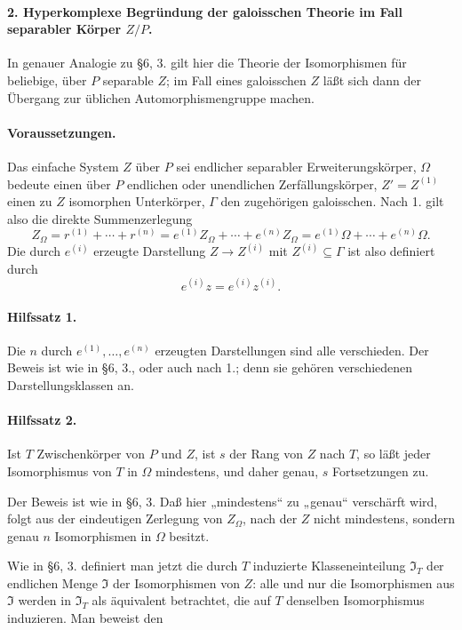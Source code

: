 \documentclass[11pt]{article}
\begin{document}
\paragraph{2. Hyperkomplexe Begründung der galoisschen Theorie im Fall separabler Körper \(Z/P\).}
In genauer Analogie zu §6, 3. gilt hier die Theorie der Isomorphismen für beliebige, über \(P\) separable \(Z\); im Fall eines galoisschen \(Z\) läßt sich dann der Übergang zur üblichen Automorphismengruppe machen.

\paragraph{Voraussetzungen.}
Das einfache System \(Z\) über \(P\) sei endlicher separabler Erweiterungskörper, \(\Omega\) bedeute einen über \(P\) endlichen oder unendlichen Zerfällungskörper, \(Z'=Z^{(1)}\) einen zu \(Z\) isomorphen Unterkörper, \(\Gamma\) den zugehörigen galoisschen. Nach 1. gilt also die direkte Summenzerlegung
\[
        Z_\Omega=r^{(1)}+\cdots+r^{(n)}
        =e^{(1)}Z_\Omega+\cdots+e^{(n)}Z_\Omega
        =e^{(1)}\Omega+\cdots+e^{(n)}\Omega .
\]
Die durch \(e^{(i)}\) erzeugte Darstellung \(Z\to Z^{(i)}\) mit \(Z^{(i)}\subseteq\Gamma\) ist also definiert durch
\[
        e^{(i)}z=e^{(i)}z^{(i)}.
\]

\paragraph{Hilfssatz 1.}
Die \(n\) durch \(e^{(1)},\ldots,e^{(n)}\) erzeugten Darstellungen sind alle verschieden. Der Beweis ist wie in §6, 3., oder auch nach 1.; denn sie gehören verschiedenen Darstellungsklassen an.

\paragraph{Hilfssatz 2.}
Ist \(T\) Zwischenkörper von \(P\) und \(Z\), ist \(s\) der Rang von \(Z\) nach \(T\), so läßt jeder Isomorphismus von \(T\) in \(\Omega\) mindestens, und daher genau, \(s\) Fortsetzungen zu.

Der Beweis ist wie in §6, 3. Daß hier „mindestens“ zu „genau“ verschärft wird, folgt aus der eindeutigen Zerlegung von \(Z_\Omega\), nach der \(Z\) nicht mindestens, sondern genau \(n\) Isomorphismen in \(\Omega\) besitzt.

Wie in §6, 3. definiert man jetzt die durch \(T\) induzierte Klasseneinteilung \(\mathfrak I_T\) der endlichen Menge \(\mathfrak I\) der Isomorphismen von \(Z\): alle und nur die Isomorphismen aus \(\mathfrak I\) werden in \(\mathfrak I_T\) als äquivalent betrachtet, die auf \(T\) denselben Isomorphismus induzieren. Man beweist den
\end{document}
